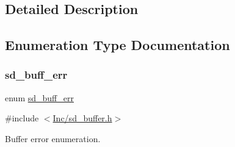 \subsection{Detailed Description}


\subsection{Enumeration Type Documentation}
\mbox{\label{group___s_d___buffer___types_ga012d8a07d989f00e3f9c4a2f62743de4}} 
\subsubsection{\texorpdfstring{sd\+\_\+buff\+\_\+err}{sd\_buff\_err}}
{\footnotesize\ttfamily enum \mbox{\hyperlink{group___s_d___buffer___types_ga012d8a07d989f00e3f9c4a2f62743de4}{sd\+\_\+buff\+\_\+err}}}



{\ttfamily \#include $<$\mbox{\hyperlink{sd__buffer_8h}{Inc/sd\+\_\+buffer.\+h}}$>$}



Buffer error enumeration. 

